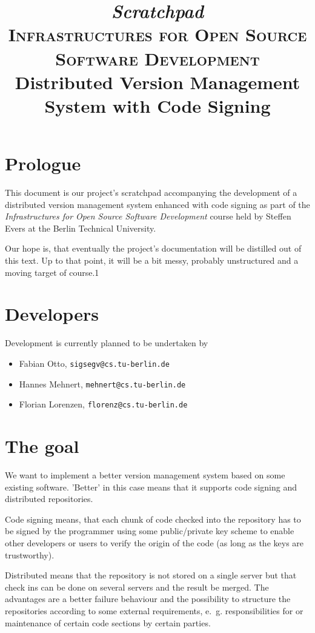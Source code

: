 \documentclass[german, 10pt, a4paper]{article}
\begin{document}
\title{\emph{Scratchpad}\\
{\scshape Infrastructures for Open Source Software Development}\\
Distributed Version Management System with Code Signing}
\maketitle

\section{Prologue}
This document is our project's scratchpad accompanying the development
of a distributed version management system enhanced with code signing as
part of the \emph{Infrastructures for Open Source Software Development}
course held by Steffen Evers at the Berlin Technical University.

Our hope is, that eventually the project's documentation will be
distilled out of this text. Up to that point, it will be a bit messy,
probably unstructured and a moving target of course.1

\section{Developers}
Development is currently planned to be undertaken by
\begin{itemize}
\item Fabian Otto, \texttt{sigsegv@cs.tu-berlin.de}
\item Hannes Mehnert, \texttt{mehnert@cs.tu-berlin.de}
\item Florian Lorenzen, \texttt{florenz@cs.tu-berlin.de}
\end{itemize}

\section{The goal}
We want to implement a better version management system based on
some existing software. 'Better' in this case means that it supports
code signing and distributed repositories.

Code signing means, that each chunk of code checked into the repository
has to be signed by the programmer using some public/private key scheme
to enable other developers or users to verify the origin of the code (as
long as the keys are trustworthy).

Distributed means that the repository is not stored on a single server
but that check ins can be done on several servers and the result be
merged. The advantages are a better failure behaviour and the
possibility to structure the repositories according to some external
requirements, e.~g. responsibilities for or maintenance of certain code
sections by certain parties.
\end{document}
